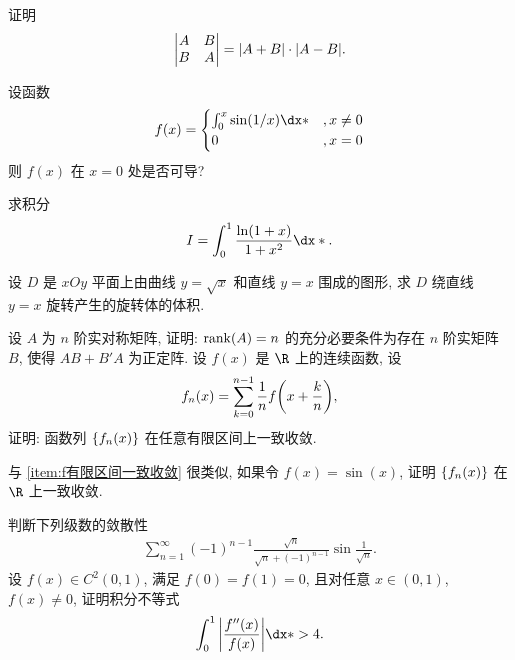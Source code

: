 \begin{exercise}[resume=exer]
\begin{exercise}
          \item 证明
          \begin{align*}
              \begin{vmatrix}
                  A & B \\ B & A
              \end{vmatrix} = \abs{A + B}\cdot\abs{A - B}.
          \end{align*}
      \end{exercise}
      \item 设函数
      \begin{align*}
          f(x) = \begin{cases}
              \int_{0}^{x}\sin(1/x) \dx* & ,x \ne 0\\
              0 & ,x = 0
          \end{cases}
      \end{align*}
      则 $ f(x) $ 在 $ x = 0 $ 处是否可导?
      \item 求积分
      \begin{align*}
          I = \int_{0}^{1} \frac{\ln(1 + x)}{1 + x^{2}} \dx*.
      \end{align*}
      \item 设 $ D $ 是 $ xOy $ 平面上由曲线 $ y = \sqrt{x} $ 和直线 $ y = x $ 围成的图形, 求 $ D $ 绕直线 $ y = x $ 旋转产生的旋转体的体积.
      \item 设 $ A $ 为 $ n $ 阶实对称矩阵, 证明: $ \rank(A) = n $ 的充分必要条件为存在 $ n $ 阶实矩阵 $ B $, 使得 $ AB + B'A $ 为正定阵.
      \sitem\label{item:f有限区间一致收敛} 设 $ f(x) $ 是 $ \R $ 上的连续函数, 设
      \begin{align*}
          f_{n}(x) = \sum_{k=0}^{n-1}\frac{1}{n}f\qty(x+\frac{k}{n}),
      \end{align*}
      证明: 函数列 $ \qty{f_{n}(x)} $ 在任意有限区间上一致收敛.
      \item 与 \ref{item:f有限区间一致收敛} 很类似, 如果令 $ f(x) = \sin(x) $, 证明 $ \qty{f_{n}(x)} $ 在 $ \R $ 上一致收敛.
      \item 判断下列级数的敛散性
      \begin{align*}
          \sum_{n = 1}^{\infty} (-1)^{n - 1} \frac{\sqrt{n}}{\sqrt{n} + (-1)^{n-1}}\sin\frac{1}{\sqrt{n}}.
      \end{align*}
      \sitem 设 $ f(x) \in C^{2}(0, 1) $, 满足 $ f(0) = f(1) = 0 $, 且对任意 $ x\in (0, 1) $, $ f(x) \ne 0 $, 证明积分不等式
      \begin{align*}
          \int_{0}^{1} \abs{\frac{f''(x)}{f(x)}} \dx* > 4.

\end{align*}
\end{exercise}
